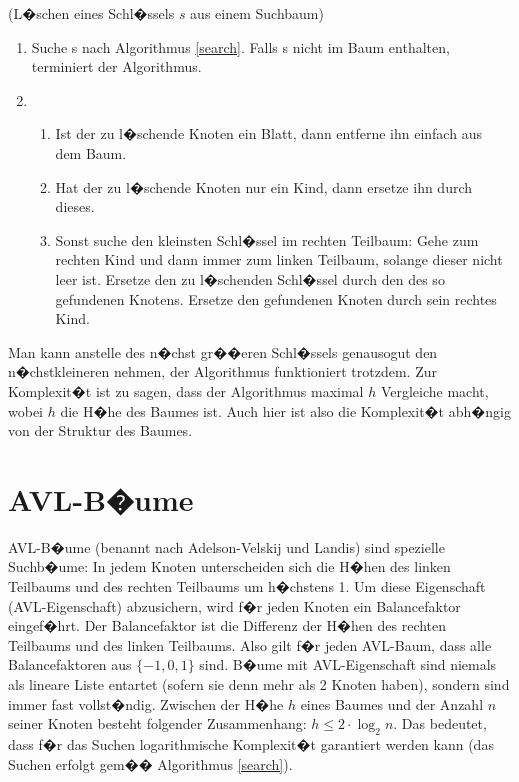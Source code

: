 \newpage
\begin{alg} \label{delete}
	(L�schen eines Schl�ssels $s$ aus einem Suchbaum)
	\begin{enumerate}
		\item Suche s nach Algorithmus \ref{search}. Falls s nicht im Baum enthalten, terminiert der Algorithmus.
		\item \begin{enumerate}
			\item Ist der zu l�schende Knoten ein Blatt, dann entferne ihn einfach aus dem Baum.
			\item Hat der zu l�schende Knoten nur ein Kind, dann ersetze ihn durch dieses.
			\item Sonst suche den kleinsten Schl�ssel im rechten Teilbaum: Gehe zum rechten Kind und dann immer zum linken Teilbaum, solange dieser nicht leer ist. Ersetze den zu l�schenden Schl�ssel durch den des so gefundenen Knotens. Ersetze den gefundenen Knoten durch sein rechtes Kind.
			\end{enumerate}
	\end{enumerate}
\end{alg}

Man kann anstelle des n�chst gr��eren Schl�ssels genausogut den n�chstkleineren nehmen, der Algorithmus funktioniert trotzdem. Zur Komplexit�t ist zu sagen, dass der Algorithmus maximal $h$ Vergleiche macht, wobei $h$ die H�he des Baumes ist. Auch hier ist also die Komplexit�t abh�ngig von der Struktur des Baumes.

\chapter{\label{appendix_avl_C}AVL-B�ume}
AVL-B�ume (benannt nach Adelson-Velskij und Landis) sind spezielle Suchb�ume: In jedem Knoten unterscheiden sich die H�hen des linken Teilbaums und des rechten Teilbaums um h�chstens 1. Um diese Eigenschaft (AVL-Eigenschaft) abzusichern, wird f�r jeden Knoten ein Balancefaktor eingef�hrt. Der Balancefaktor ist die Differenz der H�hen des rechten Teilbaums und des linken Teilbaums. Also gilt f�r jeden AVL-Baum, dass alle Balancefaktoren aus $\{-1,0,1\}$ sind. B�ume mit AVL-Eigenschaft sind niemals als lineare Liste entartet (sofern sie denn mehr als 2 Knoten haben), sondern sind immer fast vollst�ndig. Zwischen der H�he $h$ eines Baumes und der Anzahl $n$ seiner Knoten besteht folgender Zusammenhang: $h\leq 2 \cdot \log_2{n}$. Das bedeutet, dass f�r das Suchen logarithmische Komplexit�t garantiert werden kann (das Suchen erfolgt gem�� Algorithmus \ref{search}).

